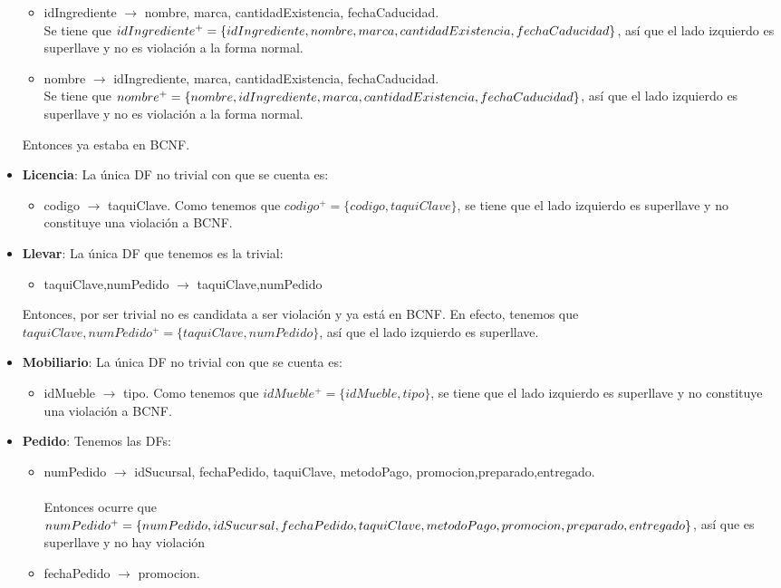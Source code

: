 \documentclass[11pt,letterpaper]{article}
\begin{document}
\begin{itemize}
\begin{itemize}
\item idIngrediente $\rightarrow$ nombre, marca, cantidadExistencia, fechaCaducidad.\\Se tiene que $idIngrediente^+=\{idIngrediente,nombre, marca,\\cantidadExistencia, fechaCaducidad\}$, así que el lado izquierdo es superllave y no es violación a la forma normal. \checkmark
\item nombre  $\rightarrow$  idIngrediente, marca, cantidadExistencia, fechaCaducidad.\\Se tiene que $nombre^+=\{nombre,idIngrediente, marca, \\cantidadExistencia, fechaCaducidad\}$, así que el lado izquierdo es superllave y no es violación a la forma normal. \checkmark
\end{itemize}

Entonces ya estaba en BCNF.
\item \textbf{Licencia}: La única DF no trivial con que se cuenta es:
\begin{itemize}
\item codigo $\rightarrow$ taquiClave. Como tenemos que $codigo^+ = \{codigo,taquiClave\}$, se tiene que el lado izquierdo es superllave y no constituye una violación a BCNF. \checkmark
\end{itemize}
\item \textbf{Llevar}: La única DF que tenemos es la trivial:

\begin{itemize}
\item taquiClave,numPedido $\rightarrow$ taquiClave,numPedido
\end{itemize}

Entonces, por ser trivial no es candidata a ser violación y ya está en BCNF. En efecto, tenemos que $taquiClave,numPedido^+ = \{taquiClave,numPedido\}$, así que el lado izquierdo es superllave. \checkmark
\item \textbf{Mobiliario}: La única DF no trivial con que se cuenta es:
\begin{itemize}
\item idMueble $\rightarrow$ tipo. Como tenemos que $idMueble^+ = \{idMueble,tipo\}$, se tiene que el lado izquierdo es superllave y no constituye una violación a BCNF. \checkmark
\end{itemize}
\item \textbf{Pedido}: Tenemos las DFs:

\begin{itemize}
\item numPedido $\rightarrow$ idSucursal, fechaPedido, taquiClave, metodoPago, promocion,preparado,entregado. \\\\Entonces ocurre que $numPedido^+ = \{numPedido,idSucursal, fechaPedido, taquiClave,\\ metodoPago, promocion,preparado,entregado\}$, así que es superllave y no hay violación \checkmark
\item fechaPedido $\rightarrow$ promocion. \\\\


\end{itemize}
\end{itemize}
\end{document}
